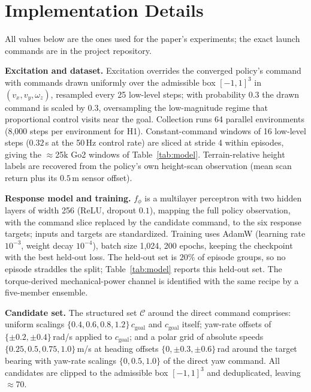 \section{Implementation Details}
\label{app:impl}

All values below are the ones used for the paper's experiments; the exact launch
commands are in the project repository.

\textbf{Excitation and dataset.}
Excitation overrides the converged policy's command with commands drawn uniformly
over the admissible box $[-1,1]^3$ in $(v_x, v_y, \omega_z)$, resampled every 25
low-level steps; with probability $0.3$ the drawn command is scaled by $0.3$,
oversampling the low-magnitude regime that proportional control visits near the
goal. Collection runs 64 parallel environments (8{,}000 steps per environment for
H1). Constant-command windows of 16 low-level steps ($0.32$\,s at the 50\,Hz
control rate) are sliced at stride 4 within episodes, giving the $\approx$25k Go2
windows of Table~\ref{tab:model}. Terrain-relative height labels are recovered
from the policy's own height-scan observation (mean scan return plus its
$0.5$\,m sensor offset).

\textbf{Response model and training.}
$f_\phi$ is a multilayer perceptron with two hidden layers of width 256 (ReLU,
dropout $0.1$), mapping the full policy observation, with the command slice
replaced by the candidate command, to the six response targets; inputs and
targets are standardized. Training uses AdamW (learning rate $10^{-3}$, weight
decay $10^{-4}$), batch size 1{,}024, 200 epochs, keeping the checkpoint with the
best held-out loss. The held-out set is $20\%$ of episode groups, so no episode
straddles the split; Table~\ref{tab:model} reports this held-out set. The
torque-derived mechanical-power channel is identified with the same recipe by a
five-member ensemble.

\textbf{Candidate set.}
The structured set $\mathcal{C}$ around the direct command comprises: uniform
scalings $\{0.4, 0.6, 0.8, 1.2\}\,c_{\text{goal}}$ and $c_{\text{goal}}$ itself;
yaw-rate offsets of $\{\pm0.2, \pm0.4\}$\,rad/s applied to $c_{\text{goal}}$; and
a polar grid of absolute speeds $\{0.25, 0.5, 0.75, 1.0\}$\,m/s at heading
offsets $\{0, \pm0.3, \pm0.6\}$\,rad around the target bearing with yaw-rate
scalings $\{0, 0.5, 1.0\}$ of the direct yaw command. All candidates are clipped
to the admissible box $[-1,1]^3$ and deduplicated, leaving $\approx$70.

